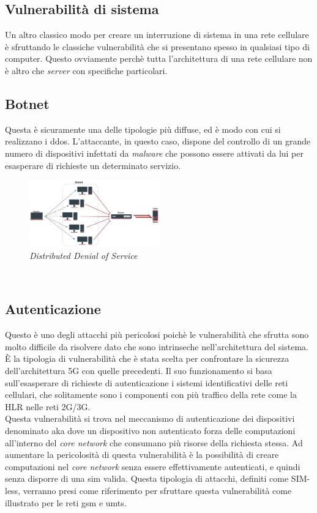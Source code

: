 \subsection{Vulnerabilità di sistema}
Un altro classico modo per creare un interruzione di sistema in una rete cellulare è sfruttando le classiche vulnerabilità che si presentano spesso in qualsiasi tipo di computer.
Questo ovviamente perchè tutta l'architettura di una rete cellulare non è altro che \textit{server} con specifiche particolari.

\subsection{Botnet}
Questa è sicuramente una delle tipologie più diffuse, ed è modo con cui si realizzano i \gls{ddos}. L'attaccante, in questo caso, dispone del controllo di 
un grande numero di dispositivi infettati da \textit{malware} che possono essere attivati da lui per esasperare di richieste un determinato servizio.
\begin{figure}[h]
    \centering
    \includegraphics[width=0.5\textwidth]{images/ddos.jpg}
    \caption{\textit{Distributed Denial of Service}}
\end{figure}\\

\subsection{Autenticazione}
Questo è uno degli attacchi più pericolosi poichè le vulnerabilità che sfrutta sono molto difficile da risolvere dato che sono intrinseche nell'architettura del sistema.
È la tipologia di vulnerabilità che è stata scelta per confrontare la sicurezza dell'architettura 5G con quelle precedenti.
Il suo funzionamento si basa sull'esasperare di richieste di autenticazione i sistemi identificativi delle reti cellulari, che solitamente 
sono i componenti con più traffico della rete come la HLR nelle reti 2G/3G.\\
Questa vulnerabilità si trova nel meccanismo di autenticazione dei dispositivi denominato \gls{aka} dove un dispositivo
non autenticato forza delle computazioni all'interno del \textit{core network} che consumano più risorse della richiesta stessa\cite{umts-dos}.
Ad aumentare la pericolosità di questa vulnerabilità è la possibilità di creare computazioni nel \textit{core network} senza essere effettivamente autenticati, e quindi 
senza disporre di una \gls{sim} valida. Questa tipologia di attacchi, definiti come SIM-less, verranno presi come riferimento per sfruttare questa vulnerabilità come illustrato per le 
reti \gls{gsm}\cite{gsm-dos-simless} e \gls{umts}\cite{umts-dos}.




